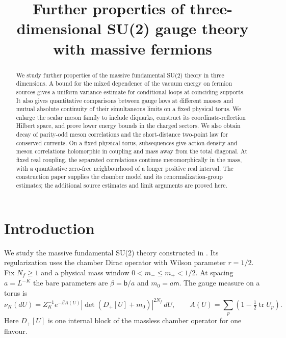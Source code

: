 \documentclass[11pt,letterpaper,reqno]{amsart}
\title[Further properties of massive SU(2) theory]{Further properties of three-dimensional SU(2) gauge theory with massive fermions}
\date{}
\theoremstyle{definition}
\theoremstyle{remark}
\begin{document}
\begin{abstract}
We study further properties of the massive fundamental SU(2)
theory in three dimensions. A bound for the mixed dependence of
the vacuum energy on fermion sources gives a uniform variance
estimate for conditional loops at coinciding supports.
It also gives quantitative comparisons between gauge laws
at different masses and mutual absolute continuity of their
simultaneous limits on a fixed physical torus. We enlarge
the scalar meson family to include diquarks, construct its
coordinate-reflection Hilbert space, and prove lower energy
bounds in the charged sectors. We also obtain decay of
parity-odd meson correlations and the short-distance two-point
law for conserved currents. On a fixed physical torus,
subsequences give action-density and meson correlations
holomorphic in coupling and mass away from the total diagonal.
At fixed real coupling, the separated correlations continue
meromorphically in the mass, with a quantitative zero-free
neighbourhood of a longer positive real interval.
The construction paper supplies
the chamber model and its renormalization-group estimates; the
additional source estimates and limit arguments are proved here.
\end{abstract}
\maketitle
\tableofcontents
\section{Introduction}\label{sec:qcdm2-introduction}

We study the massive fundamental SU(2) theory constructed in
\cite{QCDM1}. Its regularization uses the chamber Dirac operator
with Wilson parameter $r=1/2$. Fix $N_f\ge1$ and a physical mass
window $0<m_-\le m_+<1/2$. At spacing $a=L^{-K}$ the bare
parameters are $\beta=\mathsf b/a$ and $m_0=a\mathsf m$.
The gauge measure on a torus is
\[
 \nu_K(dU)=Z_K^{-1}e^{-\beta A(U)}
              |\det(D_+[U]+m_0)|^{2N_f}\,dU,
 \qquad A(U)=\sum_p(1-\tfrac12\operatorname{tr}U_p).
\]
Here $D_+[U]$ is one internal block of the massless chamber
operator for one flavour.
\end{document}
